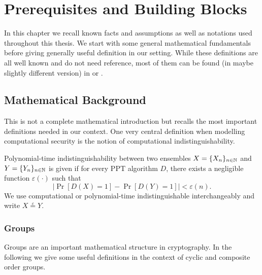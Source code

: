 
\chapter{Prerequisites and Building Blocks}\label{ch:prelims}

In this chapter we recall known facts and assumptions as well as notations used throughout this thesis.
We start with some general mathematical fundamentals before giving generally useful definition in our setting.
While these definitions are all well known and do not need reference, most of them can be found (in maybe slightly different version) in \citet{katz2008introduction} or \citet{Goldreich2001}.

\section{Mathematical Background}
This is not a complete mathematical introduction but recalls the most important definitions needed in our context.
One very central definition when modelling computational security is the notion of computational indistinguishability.

\begin{definition}
Polynomial-time indistinguishability between two ensembles $X=\{X_n\}_{n\in\mathbb{N}}$ and $Y=\{Y_n\}_{n\in\mathbb{N}}$ is given if for every \ac{PPT} algorithm $D$, there exists a negligible function $\varepsilon(\cdot)$ such that
\[
  \left| \Pr[D(X) = 1] - \Pr[D(Y) = 1] \right| < \varepsilon(n).
\]
We use computational or polynomial-time indistinguishable interchangeably and write $X\stackrel{\varepsilon}{=}Y$.
\eod
\end{definition}

\subsection{Groups}
Groups are an important mathematical structure in cryptography.
In the following we give some useful definitions in the context of cyclic and composite order groups.

